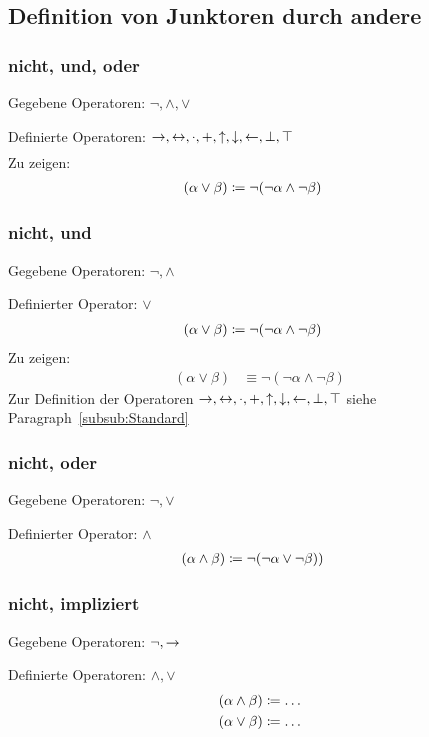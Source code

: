 \documentclass[english,ngerman,parskip=half,headsepline,footsepline,
	fleqn,notitlepage]{scrreprt}
\newcommand*{\subsubsectionname}{Paragraph}
\begin{document}
	\subsection{Definition von Junktoren durch andere}%
	\label{sub:Junktordefinitionen}

	\subsubsection{nicht, und, oder}%
	\label{subsub:Standard}
	\label{subsub:OperatorenAnfang}
	Gegebene Operatoren: $\lnot, \land, \lor$\par
	Definierte Operatoren:
	$\rightarrow, \leftrightarrow, \cdot, +, \uparrow, \downarrow, \leftarrow, \bot, \top$
	\begin{align}
	\end{align}
	Zu zeigen:
	\begin{align}
		(\alpha\lor\beta)&\coloneqq\lnot(\lnot\alpha\land\lnot\beta)
	\end{align}

	\subsubsection{nicht, und}%
	Gegebene Operatoren: $\lnot, \land$\par
	Definierter Operator: $\lor$
	\begin{align}
		(\alpha\lor\beta)&\coloneqq\lnot(\lnot\alpha\land\lnot\beta)
	\end{align}
	Zu zeigen:
	\begin{align}
		(\alpha\lor\beta)&\equiv\lnot(\lnot\alpha\land\lnot\beta)
	\end{align}
	Zur Definition der Operatoren $\rightarrow, \leftrightarrow, \cdot, +, \uparrow, \downarrow,
	\leftarrow, \bot, \top$ siehe \subsubsectionname~\vref{subsub:Standard}

	\subsubsection{nicht, oder}%
	Gegebene Operatoren: $\lnot, \lor$\par
	Definierter Operator: $\land$
	\begin{align}
		(\alpha\land\beta)&\coloneqq\lnot(\lnot\alpha\lor\lnot\beta))
	\end{align}

	\subsubsection{nicht, impliziert}%
	Gegebene Operatoren: $\lnot, \rightarrow$\par
	Definierte Operatoren: $\land, \lor$
	\begin{align}
		(\alpha\land\beta)&\coloneqq\dots\\
		(\alpha\lor\beta)&\coloneqq\dots
	\end{align}
\end{document}
